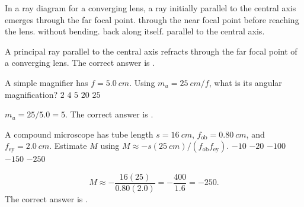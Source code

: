 \documentclass[full,print,11pt,a4paper]{physicsquiz}
\begin{document}
\begin{quizbank}
  \begin{quizquestion}[
    id=optics-ray-016,
    topic=ray-diagrams,
    difficulty=foundation,
    marks=1,
    correct=A,
    tags={ray-diagram,thin-lens},
    outcome={Recall a principal ray for a converging lens}
  ]
    In a ray diagram for a converging lens, a ray initially parallel to the
    central axis emerges
    \choices
      {through the far focal point.}
      {through the near focal point before reaching the lens.}
      {without bending.}
      {back along itself.}
      {parallel to the central axis.}
  \end{quizquestion}
  \begin{quizsolution}
    A principal ray parallel to the central axis refracts through the far focal
    point of a converging lens. The correct answer is \quizcorrectletter.
  \end{quizsolution}

  \begin{quizquestion}[
    id=optics-magnifier-017,
    topic=optical-instruments,
    difficulty=applied,
    marks=1,
    correct=C,
    tags={simple-magnifier,angular-magnification},
    outcome={Compute simple magnifier angular magnification}
  ]
    A simple magnifier has \(f=\SI{5.0}{cm}\). Using
    \(m_u=\SI{25}{cm}/f\), what is its angular magnification?
    \choices
      {\(2\)}
      {\(4\)}
      {\(5\)}
      {\(20\)}
      {\(25\)}
  \end{quizquestion}
  \begin{quizsolution}
    \(m_u=25/5.0=5\). The correct answer is \quizcorrectletter.
  \end{quizsolution}

  \begin{quizquestion}[
    id=optics-microscope-018,
    topic=optical-instruments,
    difficulty=applied,
    marks=1,
    correct=E,
    tags={compound-microscope,magnification},
    outcome={Compute compound microscope magnification}
  ]
    A compound microscope has tube length \(s=\SI{16}{cm}\),
    \(f_{\text{ob}}=\SI{0.80}{cm}\), and
    \(f_{\text{ey}}=\SI{2.0}{cm}\). Estimate \(M\) using
    \(M\approx-s(\SI{25}{cm})/(f_{\text{ob}}f_{\text{ey}})\).
    \choices
      {\(-10\)}
      {\(-20\)}
      {\(-100\)}
      {\(-150\)}
      {\(-250\)}
  \end{quizquestion}
  \begin{quizsolution}
    \[
      M\approx-\frac{16(25)}{0.80(2.0)}
      =
      -\frac{400}{1.6}
      =
      -250.
    \]
    The correct answer is \quizcorrectletter.
  \end{quizsolution}


\end{quizbank}
\end{document}
